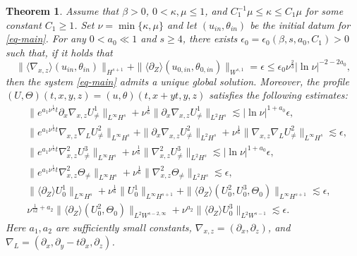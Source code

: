 \documentclass[10pt,a4paper]{amsart}
\newtheorem{theorem}{Theorem}
\newcommand{\wtb}{\langle\partial_Z\rangle }
\begin{document}
	\begin{theorem}\label{mainthe}
		Assume that $\beta>0$, $0<\kappa,\mu\leq1$, and $C_1^{-1}\mu\leq\kappa\leq C_1\mu$ for some constant $C_1\geq1$. Set $\nu=\min\{\kappa,\mu\}$ and let $(u_{in},\theta_{in})$ be the initial datum for \eqref{eq-main}. For any $0<a_0\ll1$ and $s\geq4$, there exists $\epsilon_0=\epsilon_0(\beta,s,a_0,C_1)>0$ such that, if it holds that
		\begin{equation}
			\|\langle \nabla_{x,z}\rangle (u_{in},\theta_{in})\|_{H^{s+1}}+\|\wtb(u_{0,in},\theta_{0,in})\|_{W^{s,1}}=\epsilon\leq\epsilon_0\nu^{\frac{2}{3}}|\ln{\nu}|^{-2-2a_0},
		\end{equation}
		then the system \eqref{eq-main} admits a unique global solution. Moreover, the profile $(U,\Theta)(t,x,y,z)=(u,\theta)(t,x+yt,y,z)$ satisfies the following estimates:
		\begin{subequations}\label{est-main}
			\begin{align}
				&\|e^{a_1\nu^{\frac{1}{3}}t}\partial_x\nabla_{x,z}U^1_{\neq}\|_{L^\infty H^s}+\nu^{\frac{1}{6}}\|\partial_x\nabla_{x,z}U^1_{\neq}\|_{L^2H^s}\lesssim|\ln\nu|^{1+a_0}\epsilon,\label{main-u1}\\
				&\|e^{a_1\nu^{\frac{1}{3}}t}\nabla_{x,z}\nabla_LU^2_{\neq}\|_{L^\infty H^s}+\|\partial_x\nabla_{x,z}U^2_{\neq}\|_{L^2 H^s}+\nu^{\frac{1}{6}}\|\nabla_{x,z}\nabla_LU^2_{\neq}\|_{L^\infty H^s}\lesssim\epsilon,\label{main-u2}\\
				&\|e^{a_1\nu^{\frac{1}{3}}t}\nabla_{x,z}^2U^3_{\neq}\|_{L^\infty H^s}+\nu^{\frac{1}{6}}\|\nabla_{x,z}^2U^3_{\neq}\|_{L^2H^s}\lesssim|\ln\nu|^{1+a_0}\epsilon,\label{main-u3}\\
				&\|e^{a_1\nu^{\frac{1}{3}}t}\nabla_{x,z}^2\Theta_{\neq}\|_{L^\infty H^s}+\nu^{\frac{1}{6}}\|\nabla_{x,z}^2\Theta_{\neq}\|_{L^2H^s}\lesssim\epsilon,\label{main-theta}\\
				&\|\wtb U^1_0\|_{L^\infty H^s}+\nu^{\frac{1}{6}}\| U^1_0\|_{L^\infty H^{s+1}}+\|\wtb (U^{2}_0,U^3_0,\Theta_0)\|_{L^\infty H^{s+1}}\lesssim\epsilon,\label{main-u10}\\
				&\nu^{\frac{1}{12}+a_2}\|\wtb(U^2_0,\Theta_0)\|_{L^2W^{s-2,\infty}}+\nu^{a_2}\|\wtb U^3_{0}\|_{L^2W^{s-1}}\lesssim\epsilon.\label{main-u230}
			\end{align}
		\end{subequations}
		Here $a_1,a_2$ are sufficiently small constants, $\nabla_{x,z}=(\partial_x,\partial_z)$, and $\nabla_L=(\partial_x,\partial_y-t\partial_x,\partial_z)$.
	\end{theorem}
\end{document}
